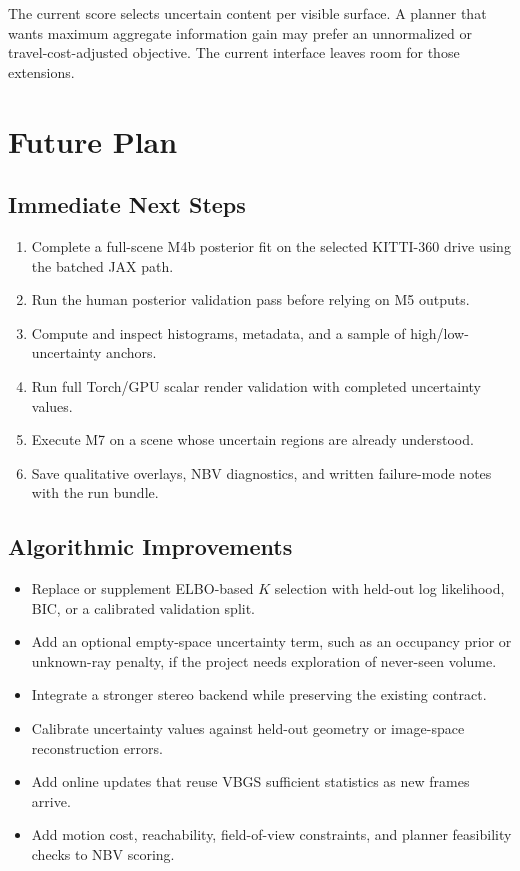 \documentclass[11pt]{article}
\begin{document}
The current score selects uncertain content per visible surface. A planner that
wants maximum aggregate information gain may prefer an unnormalized or
travel-cost-adjusted objective. The current interface leaves room for those
extensions.

\section{Future Plan}

\subsection{Immediate Next Steps}

\begin{enumerate}
  \item Complete a full-scene M4b posterior fit on the selected KITTI-360
        drive using the batched JAX path.
  \item Run the human posterior validation pass before relying on M5 outputs.
  \item Compute  and inspect histograms, metadata, and a sample of
        high/low-uncertainty anchors.
  \item Run full Torch/GPU scalar render validation with completed uncertainty
        values.
  \item Execute M7 on a scene whose uncertain regions are already understood.
  \item Save qualitative overlays, NBV diagnostics, and written failure-mode
        notes with the run bundle.
\end{enumerate}

\subsection{Algorithmic Improvements}

\begin{itemize}
  \item Replace or supplement ELBO-based \(K\) selection with held-out log
        likelihood, BIC, or a calibrated validation split.
  \item Add an optional empty-space uncertainty term, such as an occupancy
        prior or unknown-ray penalty, if the project needs exploration of
        never-seen volume.
  \item Integrate a stronger stereo backend while preserving the existing
         contract.
  \item Calibrate uncertainty values against held-out geometry or image-space
        reconstruction errors.
  \item Add online updates that reuse VBGS sufficient statistics as new frames
        arrive.
  \item Add motion cost, reachability, field-of-view constraints, and planner
        feasibility checks to NBV scoring.
\end{itemize}
\end{document}
